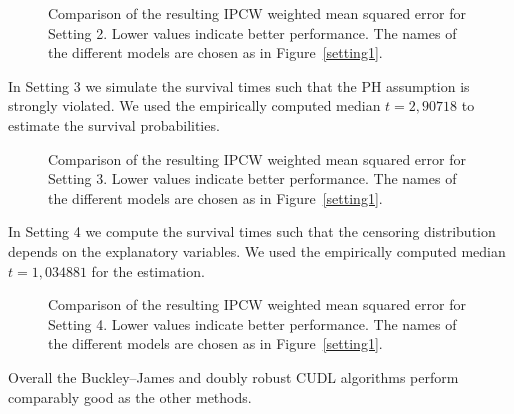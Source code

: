 \documentclass[12pt, a4paper]{scrartcl}
\theoremstyle{definition}
\theoremstyle{plain}
\numberwithin{equation}{section}
\numberwithin{figure}{section}
\numberwithin{table}{section}
\begin{document}
	\begin{figure}
		\centering	
		
		\vspace{-0.3cm}
		\caption{Comparison of the resulting IPCW weighted mean squared error for Setting 2. Lower values indicate better performance. The names of the different models are chosen as in Figure~\ref{setting1}.}
		\label{setting2}
	\end{figure}
	
	In Setting 3 we simulate the survival times such that the PH assumption is strongly violated.
	We used the empirically computed median $t = 2,90718$ to estimate the survival probabilities.
	
	
	\begin{figure}
		\centering	
		
		\vspace{-0.3cm}
		\caption{Comparison of the resulting IPCW weighted mean squared error for Setting 3. Lower values indicate better performance. The names of the different models are chosen as in Figure~\ref{setting1}.}
		\label{setting3}
	\end{figure}
	
	In Setting 4 we compute the survival times such that the censoring distribution depends on the explanatory variables.
	We used the empirically computed median $t = 1,034881$ for the estimation.
	
	\begin{figure}
		\centering	
		
		\vspace{-0.3cm}
		\caption{Comparison of the resulting IPCW weighted mean squared error for Setting 4. Lower values indicate better performance. The names of the different models are chosen as in Figure~\ref{setting1}.}
		\label{setting4}
	\end{figure}

	Overall the Buckley--James and doubly robust CUDL algorithms perform comparably good as the other methods.
	
\end{document}

